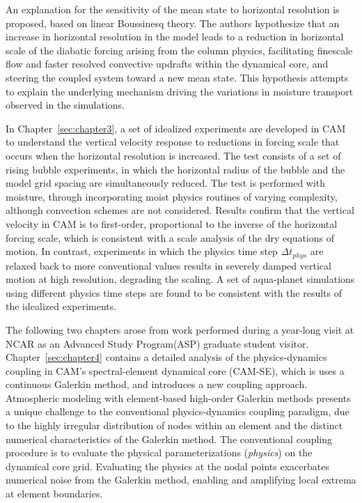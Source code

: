 An explanation for the sensitivity of the mean state to horizontal resolution is proposed, based on linear Boussinesq theory. The authors hypothesize that an increase in horizontal resolution in the model leads to a reduction in horizontal scale of the diabatic forcing arising from the column physics, facilitating finescale flow and faster resolved convective updrafts within the dynamical core, and steering the coupled system toward a new mean state. This hypothesis attempts to explain the underlying mechanism driving the variations in moisture transport observed in the simulations.

In Chapter~\ref{sec:chapter3}, a set of idealized experiments are developed in CAM to understand the vertical velocity response to reductions in forcing scale that occurs when the horizontal resolution is increased. The test consists of a set of rising bubble experiments, in which the horizontal radius of the bubble and the model grid spacing are simultaneously reduced. The test is performed with moisture, through incorporating moist physics routines of varying complexity, although convection schemes are not considered. Results confirm that the vertical velocity in CAM is to first-order, proportional to the inverse of the horizontal forcing scale, which is consistent with a scale analysis of the dry equations of motion. In contrast, experiments in which the physics time step $\Delta t_{phys}$ are relaxed back to more conventional values results in severely damped vertical motion at high resolution, degrading the scaling. A set of aqua-planet simulations using different physics time steps are found to be consistent with the results of the idealized experiments.

The following two chapters arose from work performed during a year-long visit at NCAR as an Advanced Study Program(ASP) graduate student visitor. Chapter~\ref{sec:chapter4} contains a detailed analysis of the physics-dynamics coupling in CAM's spectral-element dynamical core (CAM-SE), which is uses a continuous Galerkin method, and introduces a new coupling approach. Atmospheric modeling with element-based high-order Galerkin methods presents a unique challenge to the conventional physics-dynamics coupling paradigm, due to the highly irregular distribution of nodes within an element and the distinct numerical characteristics of the Galerkin method. The conventional coupling procedure is to evaluate the physical parameterizations ({\em{physics}}) on the dynamical core grid. Evaluating the physics at the nodal points exacerbates numerical noise from the Galerkin method, enabling and amplifying local extrema at element boundaries. 

